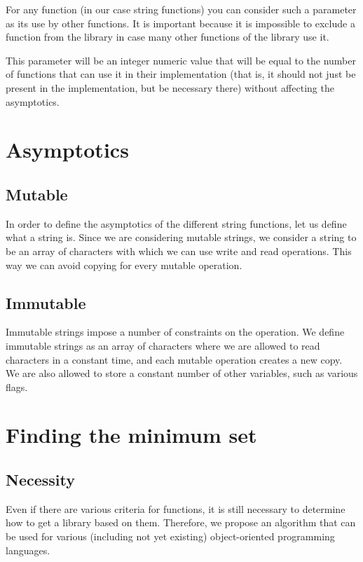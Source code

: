\documentclass[anonymous,sigplan,review,11pt,nonacm,natbib=false]{acmart}
\begin{document}
    For any function (in our case string functions) you can consider such a parameter as its use by other functions. It is important because it is impossible to exclude a function from the library in case many other functions of the library use it.

    This parameter will be an integer numeric value that will be equal to the number of functions that can use it in their implementation (that is, it should not just be present in the implementation, but be necessary there) without affecting the asymptotics.

    \section{Asymptotics}

    \subsection{Mutable}

    In order to define the asymptotics of the different string functions, let us define what a string is. Since we are considering mutable strings, we consider a string to be an array of characters with which we can use write and read operations. This way we can avoid copying for every mutable operation.

    \subsection{Immutable}

    Immutable strings impose a number of constraints on the operation. We define immutable strings as an array of characters where we are allowed to read characters in a constant time, and each mutable operation creates a new copy. We are also allowed to store a constant number of other variables, such as various flags.

    \section{Finding the minimum set}

    \subsection{Necessity}

    Even if there are various criteria for functions, it is still necessary to determine how to get a library based on them. Therefore, we propose an algorithm that can be used for various (including not yet existing) object-oriented programming languages.
\end{document}
